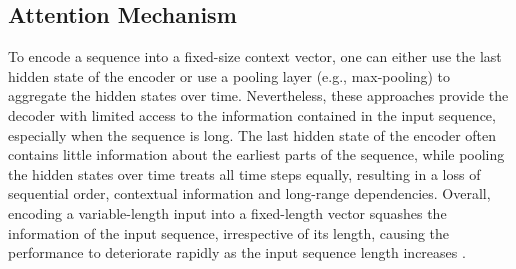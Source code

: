 



\subsection{Attention Mechanism}

To encode a sequence into a fixed-size context vector, one can either use the last hidden state of the encoder or use a pooling layer (e.g., max-pooling) to aggregate the hidden states over time. Nevertheless, these approaches provide the decoder with limited access to the information contained in the input sequence, especially when the sequence is long. The last hidden state of the encoder often contains little information about the earliest parts of the sequence, while pooling the hidden states over time treats all time steps equally, resulting in a loss of sequential order, contextual information and long-range dependencies. Overall, encoding a variable-length input into a fixed-length vector squashes the information of the input sequence, irrespective of its length, causing the performance to deteriorate rapidly as the input sequence length increases \citep{bahdanau2014neural}. 

